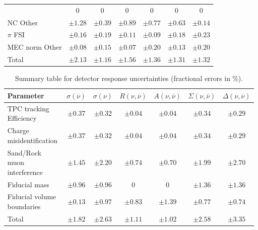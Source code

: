 \begin{table}
\begin{tabular}{lcccccc}
& $0$ & $0$ & $0$ & $0$ & $0$ & $0$ \\
NC Other 
& $\pm1.28$ & $\pm0.39$ & $\pm0.89$ & $\pm0.77$ & $\pm0.63$ & $\pm0.14$ \\
$\pi$ FSI
& $\pm0.16$ & $\pm0.19$ & $\pm0.11$ & $\pm0.09$ & $\pm0.18$ & $\pm0.23$ \\
MEC norm Other & $\pm0.08$ & $\pm0.15$ & $\pm0.07$ & $\pm0.20$ & $\pm0.13$ & $\pm0.20$ \\
\hline
Total & $\pm2.13$ & $\pm1.16$ & $\pm1.56$ & $\pm1.36$ & $\pm1.31$ & $\pm1.32$\\
\hline
\hline
\end{tabular}
\end{table}


\begin{table}
\caption{
\label{tab:DetectorResponseSummary} 
Summary table for detector response uncertainties (fractional errors in $\%$).
}

\begin{tabular}{lcccccc}
\hline
\hline
Parameter &
$\sigma(\overline{\nu})$ & $\sigma(\nu)$ & $R (\nu,\overline{\nu})$ & $A(\nu,\overline{\nu})$ & $\Sigma(\nu,\overline{\nu})$ & $\Delta (\nu,\overline{\nu})$ \\
\hline
TPC tracking Efficiency
& $\pm0.37$ & $\pm0.32$ & $\pm0.04$ & $\pm0.04$ & $\pm0.34$ & $\pm0.29$ \\
Charge misidentification
& $\pm0.37$ & $\pm0.32$ & $\pm0.04$ & $\pm0.04$ & $\pm0.34$ & $\pm0.29$ \\
Sand/Rock muon interference
& $\pm1.45$ & $\pm2.20$ & $\pm0.74$ & $\pm0.70$ & $\pm1.99$ & $\pm2.70$ \\
Fiducial mass
& $\pm0.96$ & $\pm0.96$ & $0$ & $0$ & $\pm1.36$ & $\pm1.36$ \\
Fiducial volume boundaries
& $\pm0.13$ & $\pm0.97$ & $\pm0.83$ & $\pm1.39$ & $\pm0.77$ & $\pm0.74$ \\
\hline
Total & $\pm1.82$ & $\pm2.63$ & $\pm1.11$ & $\pm1.02$ & $\pm2.58$ & $\pm3.35$\\
\hline
\hline
\end{tabular}
\end{table}


